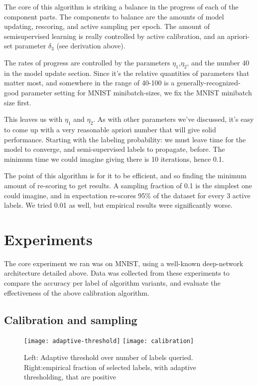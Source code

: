 \documentclass{article}
\begin{document}
The core of this algorithm is striking a balance in the progress of each of the component parts.  The components to balance are the amounts of model updating, rescoring, and active sampling per epoch.  The amount of semisupervised learning is really controlled by active calibration, and an apriori-set parameter $\delta_3$ (see derivation above).  

The rates of progress are controlled by the parameters $\eta_1$,$\eta_2$, and the number 40 in the model update section.  Since it's the relative quantities of parameters that matter most, and somewhere in the range of 40-100 is a generally-recognized-good parameter setting for MNIST minibatch-sizes, we fix the MNIST minibatch size first.  

This leaves us with $\eta_1$ and $\eta_2$.  As with other parameters we've discussed, it's easy to come up with a very reasonable apriori number that will give solid performance.  Starting with the labeling probability: we must leave time for the model to converge, and semi-supervised labels to propagate, before.  The minimum time we could imagine giving there is 10 iterations, hence 0.1.  

The point of this algorithm is for it to be efficient, and so finding the minimum amount of re-scoring to get results.  A sampling fraction of 0.1 is the simplest one could imagine, and in expectation re-scores 95\% of the dataset for every 3 active labels.  We tried 0.01 as well, but empirical results were significantly worse.  



\section{Experiments}
The core experiment we ran was on MNIST, using a well-known deep-network architecture detailed above.  Data was collected from these experiments to compare the accuracy per label of algorithm variants, and evaluate the effectiveness of the above calibration algorithm.  

\subsection{Calibration and sampling}
\begin{figure}[h]
  \center 
  \texttt{[image: adaptive-threshold]}
  \texttt{[image: calibration]}
  \caption{Left: Adaptive threshold over number of labels queried.  Right:empirical fraction of selected labels, with adaptive thresholding, that are positive}
\end{figure}
\end{document}

